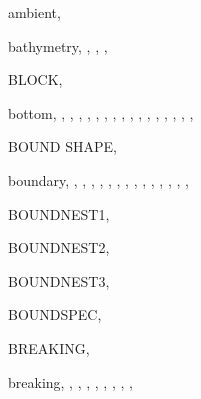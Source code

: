 \documentclass[12pt]{book}
\begin{document}
\begin{theindex}
  \item ambient, 

  \indexspace

  \item bathymetry, , , , 
  \item BLOCK, 
  \item bottom, , , , 
		, , , 
		, , , 
		, , , 
		, , , 
		, 
  \item BOUND SHAPE, 
  \item boundary, , , , 
		, , , 
		, , , 
		, , , 
		, , 
  \item BOUNDNEST1, 
  \item BOUNDNEST2, 
  \item BOUNDNEST3, 
  \item BOUNDSPEC, 
  \item BREAKING, 
  \item breaking, , , , 
		, , , 
		, , 

  \indexspace


\end{theindex}
\end{document}
